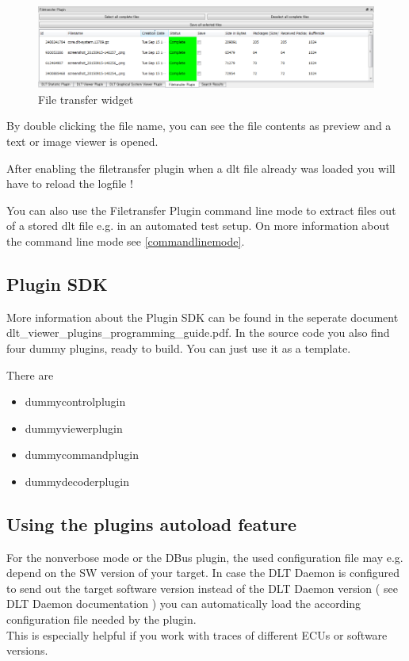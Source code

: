 \documentclass[a4paper,11pt]{article}
\begin{document}
\par

\begin{figure}[H]
 \centering
 \includegraphics[width=1.0\textwidth]{images/filetransfer_list.png}
 \caption{File transfer widget}
 \label{fig:filetransferwidget}
\end{figure}


By double clicking the file name, you can see the file contents as preview and a text or image viewer is opened.

After enabling the filetransfer plugin when a dlt file already was loaded you will have to reload the logfile !

You can also use the Filetransfer Plugin command line mode to extract files out of a stored dlt file e.g. in an automated test setup.
On more information about the command line mode see \autoref{commandlinemode}.

\subsection{Plugin SDK}

More information about the Plugin SDK can be found in the seperate document dlt\_viewer\_plugins\_programming\_guide.pdf.
In the source code you also find four dummy plugins, ready to build. You can just use it as a template.

There are
\begin{itemize}
    \item dummycontrolplugin
    \item dummyviewerplugin
    \item dummycommandplugin
    \item dummydecoderplugin
\end{itemize}

\subsection{Using the plugins autoload feature}
\label{usingautoload}
For the nonverbose mode or the DBus plugin, the used configuration file may e.g. depend on the SW version of your target.
In case the DLT Daemon is configured to send out the target software version instead of the DLT Daemon version ( see DLT Daemon documentation )
you can automatically load the according configuration file needed by the plugin.\\
This is especially helpful if you work with traces of different ECUs or software versions.
\end{document}
